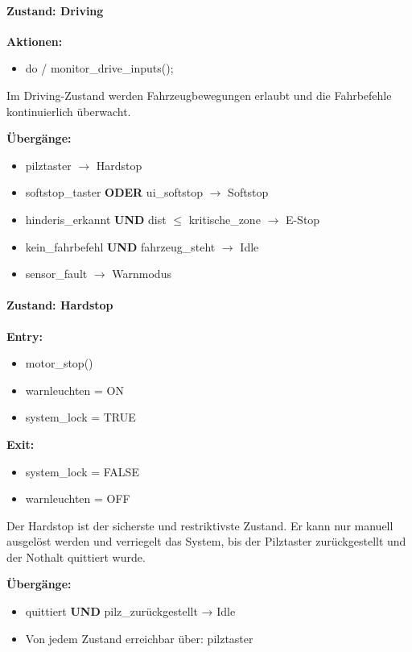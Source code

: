 \paragraph{Zustand: Driving}

\textbf{Aktionen:}
\begin{itemize}
    \item do / monitor\_drive\_inputs();
\end{itemize}

Im Driving-Zustand werden Fahrzeugbewegungen erlaubt und die Fahrbefehle
kontinuierlich überwacht.

\textbf{Übergänge:}
\begin{itemize}
    \item pilztaster $\to$ \ac{Hardstop}
    \item softstop\_taster \textbf{ODER} ui\_softstop $\to$ \ac{Softstop}
    \item hinderis\_erkannt \textbf{UND} dist $\leq$ kritische\_zone $\to$ \ac{E-Stop}
    \item kein\_fahrbefehl \textbf{UND} fahrzeug\_steht $\to$ Idle
    \item sensor\_fault $\to$ Warnmodus
\end{itemize}


\paragraph{Zustand: \ac{Hardstop}}

\textbf{Entry:}
\begin{itemize}
    \item motor\_stop()
    \item warnleuchten = ON
    \item system\_lock = TRUE
\end{itemize}

\textbf{Exit:}
\begin{itemize}
    \item system\_lock = FALSE
    \item warnleuchten = OFF
\end{itemize}

Der \ac{Hardstop} ist der sicherste und restriktivste Zustand. Er kann nur manuell
ausgelöst werden und verriegelt das System, bis der Pilztaster zurückgestellt
und der Nothalt quittiert wurde.

\textbf{Übergänge:}
\begin{itemize}
    \item quittiert \textbf{UND} pilz\_zurückgestellt → Idle
    \item Von jedem Zustand erreichbar über: pilztaster
\end{itemize}


